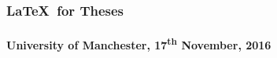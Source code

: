 \documentclass{beamer}
\begin{document}
\begin{frame}
\frametitle{\LaTeX \ for Theses}
\framesubtitle{University of Manchester, 17\textsuperscript{th} November, 2016}
\end{frame}
\end{document}
